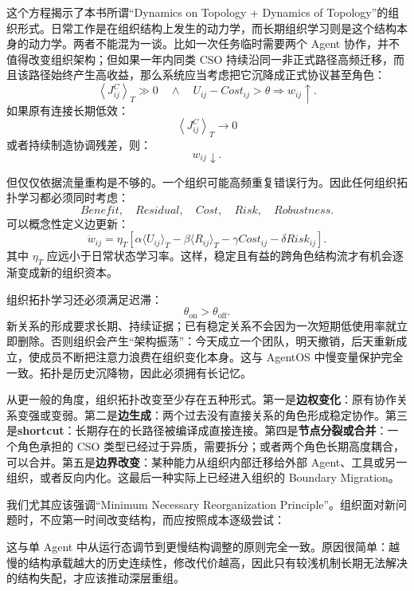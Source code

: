 这个方程揭示了本书所谓“Dynamics on Topology + Dynamics of Topology”的组织形式。日常工作是在组织结构上发生的动力学，而长期组织学习则是这个结构本身的动力学。两者不能混为一谈。比如一次任务临时需要两个 Agent 协作，并不值得改变组织架构；但如果一年内同类 CSO 持续沿同一非正式路径高频迁移，而且该路径始终产生高收益，那么系统应当考虑把它沉降成正式协议甚至角色：
\[
\left\langle
J^{C}_{ij}
\right\rangle_T
\gg 0
\quad\land\quad
U_{ij}-Cost_{ij}>\theta
\Rightarrow
w_{ij}\uparrow.
\]
如果原有连接长期低效：
\[
\left\langle
J^C_{ij}
\right\rangle_T\rightarrow0
\]
或者持续制造协调残差，则：
\[
w_{ij}\downarrow.
\]

但仅仅依据流量重构是不够的。一个组织可能高频重复错误行为。因此任何组织拓扑学习都必须同时考虑：
\[
Benefit,\quad Residual,\quad Cost,\quad Risk,\quad Robustness.
\]
可以概念性定义边更新：
\[
\dot w_{ij}
=
\eta_T
\left[
\alpha
\langle U_{ij}\rangle_T
-
\beta
\langle R_{ij}\rangle_T
-
\gamma Cost_{ij}
-
\delta Risk_{ij}
\right].
\]
其中 $\eta_T$ 应远小于日常状态学习率。这样，稳定且有益的跨角色结构流才有机会逐渐变成新的组织资本。

组织拓扑学习还必须满足迟滞：
\[
\theta_{\mathrm{on}}
>
\theta_{\mathrm{off}}.
\]
新关系的形成要求长期、持续证据；已有稳定关系不会因为一次短期低使用率就立即删除。否则组织会产生“架构振荡”：今天成立一个团队，明天撤销，后天重新成立，使成员不断把注意力浪费在组织变化本身。这与 AgentOS 中慢变量保护完全一致。拓扑是历史沉降物，因此必须拥有长记忆。

从更一般的角度，组织拓扑改变至少存在五种形式。第一是\textbf{边权变化}：原有协作关系变强或变弱。第二是\textbf{边生成}：两个过去没有直接关系的角色形成稳定协作。第三是\textbf{shortcut}：长期存在的长路径被编译成直接连接。第四是\textbf{节点分裂或合并}：一个角色承担的 CSO 类型已经过于异质，需要拆分；或者两个角色长期高度耦合，可以合并。第五是\textbf{边界改变}：某种能力从组织内部迁移给外部 Agent、工具或另一组织，或者反向内化。这最后一种实际上已经进入组织的 Boundary Migration。

我们尤其应该强调“Minimum Necessary Reorganization Principle”。组织面对新问题时，不应第一时间改变结构，而应按照成本逐级尝试：
\begin{statementbox}
\centering
{}
\end{statementbox}
这与单 Agent 中从运行态调节到更慢结构调整的原则完全一致。原因很简单：越慢的结构承载越大的历史连续性，修改代价越高，因此只有较浅机制长期无法解决的结构失配，才应该推动深层重组。


